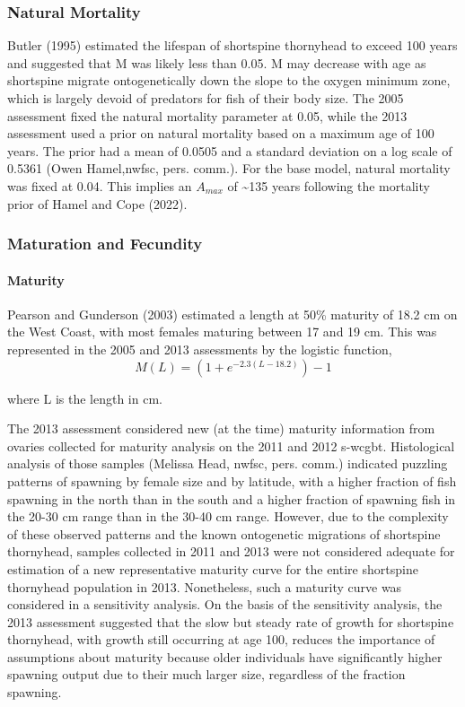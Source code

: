 \documentclass[11pt,
  english,
  letterpaper,
]{article}
\begin{document}
\hypertarget{natural-mortality}{%
\subsubsection{Natural Mortality}\label{natural-mortality}}

Butler (1995) estimated the lifespan of shortspine thornyhead to exceed 100 years and suggested that M was likely less than 0.05. M may decrease with age as shortspine migrate ontogenetically down the slope to the oxygen minimum zone, which is largely devoid of predators for fish of their body size. The 2005 assessment fixed the natural mortality parameter at 0.05, while the 2013 assessment used a prior on natural mortality based on a maximum age of 100 years. The prior had a mean of 0.0505 and a standard deviation on a log scale of 0.5361 (Owen Hamel,\gls{nwfsc}, pers. comm.). For the base model, natural mortality was fixed at 0.04. This implies an \(A_{max}\) of \textasciitilde135 years following the mortality prior of Hamel and Cope (2022).

\hypertarget{maturation-and-fecundity}{%
\subsubsection{Maturation and Fecundity}\label{maturation-and-fecundity}}

\hypertarget{maturity}{%
\paragraph{Maturity}\label{maturity}}

Pearson and Gunderson (2003) estimated a length at 50\% maturity of 18.2 cm on the West Coast, with most females maturing between 17 and 19 cm. This was represented in the 2005 and 2013 assessments by the logistic function, \begin{equation} M(L) = (1 + e^{-2.3(L-18.2)})-1\end{equation}

where L is the length in cm.

The 2013 assessment considered new (at the time) maturity information from ovaries collected for maturity analysis on the 2011 and 2012 \gls{s-wcgbt}. Histological analysis of those samples (Melissa Head, \gls{nwfsc}, pers. comm.) indicated puzzling patterns of spawning by female size and by latitude, with a higher fraction of fish spawning in the north than in the south and a higher fraction of spawning fish in the 20-30 cm range than in the 30-40 cm range. However, due to the complexity of these observed patterns and the known ontogenetic migrations of shortspine thornyhead, samples collected in 2011 and 2013 were not considered adequate for estimation of a new representative maturity curve for the entire shortspine thornyhead population in 2013. Nonetheless, such a maturity curve was considered in a sensitivity analysis. On the basis of the sensitivity analysis, the 2013 assessment suggested that the slow but steady rate of growth for shortspine thornyhead, with growth still occurring at age 100, reduces the importance of assumptions about maturity because older individuals have significantly higher spawning output due to their much larger size, regardless of the fraction spawning.
\end{document}
